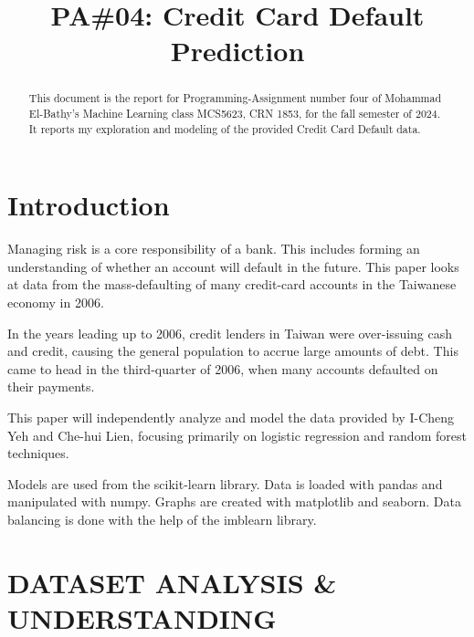 \documentclass[conference]{IEEEtran}
\begin{document}
\title{PA\#04: Credit Card Default Prediction}

\author{
}

\maketitle

\begin{abstract}
	This document is the report for Programming-Assignment number four of Mohammad El-Bathy's Machine Learning class MCS5623, CRN 1853, for the fall semester of 2024.
	It reports my exploration and modeling of the provided Credit Card Default data.
\end{abstract}

\section{Introduction}

Managing risk is a core responsibility of a bank. This includes forming an
understanding of whether an account will default in the future. This paper
looks at data from the mass-defaulting of many credit-card accounts in the
Taiwanese economy in 2006. \cite{default_of_credit_card_clients_350}

In the years leading up to 2006, credit lenders in Taiwan were over-issuing
cash and credit, causing the general population to accrue large amounts of
debt. This came to head in the third-quarter of 2006, when many accounts
defaulted on their payments. \cite{Yeh2009TheCO}

This paper will independently analyze and model the data provided by I-Cheng
Yeh and Che-hui Lien, focusing primarily on logistic regression and random
forest techniques.

Models are used from the scikit-learn library\cite{scikit-learn}. Data is
loaded with pandas\cite{pandas2020}\cite{pandas2010} and manipulated with
numpy\cite{numpy}. Graphs are created with matplotlib\cite{matplotlib} and
seaborn\cite{seaborn}. Data balancing is done with the help of the
imblearn\cite{imblearn} library.

\FloatBarrier
\section{DATASET ANALYSIS \& UNDERSTANDING}
\end{document}
